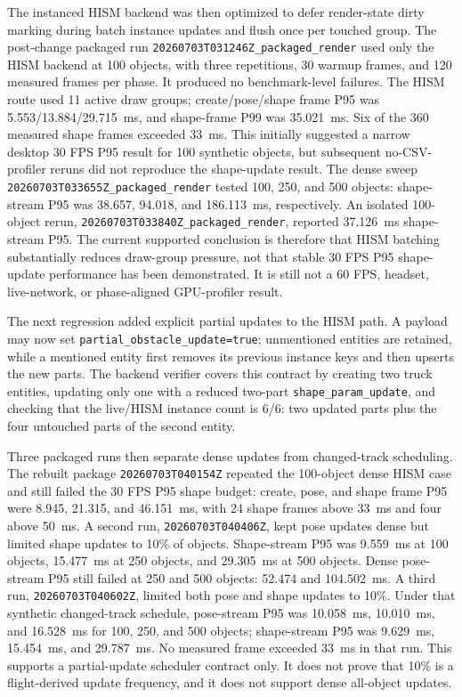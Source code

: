 ﻿\documentclass[11pt,a4paper]{article}
\begin{document}
The instanced HISM backend was then optimized to defer render-state dirty
marking during batch instance updates and flush once per touched group. The
post-change packaged run
\texttt{20260703T031246Z\_packaged\_render} used only the HISM backend at 100
objects, with three repetitions, 30 warmup frames, and 120 measured frames per
phase. It produced no benchmark-level failures. The HISM route used 11 active
draw groups; create/pose/shape frame P95 was 5.553/13.884/29.715~ms, and
shape-frame P99 was 35.021~ms. Six of the 360 measured shape frames exceeded
33~ms. This initially suggested a narrow desktop 30 FPS P95 result for 100
synthetic objects, but subsequent no-CSV-profiler reruns did not reproduce the
shape-update result. The dense sweep
\texttt{20260703T033655Z\_packaged\_render} tested 100, 250, and 500 objects:
shape-stream P95 was 38.657, 94.018, and 186.113~ms, respectively. An isolated
100-object rerun, \texttt{20260703T033840Z\_packaged\_render}, reported
37.126~ms shape-stream P95. The current supported conclusion is therefore that
HISM batching substantially reduces draw-group pressure, not that stable 30 FPS
P95 shape-update performance has been demonstrated. It is still not a 60 FPS,
headset, live-network, or phase-aligned GPU-profiler result.

The next regression added explicit partial updates to the HISM path. A payload
may now set \texttt{partial\_obstacle\_update=true}; unmentioned entities are
retained, while a mentioned entity first removes its previous instance keys and
then upserts the new parts. The backend verifier covers this contract by creating
two truck entities, updating only one with a reduced two-part
\texttt{shape\_param\_update}, and checking that the live/HISM instance count is
6/6: two updated parts plus the four untouched parts of the second entity.

Three packaged runs then separate dense updates from changed-track scheduling.
The rebuilt package \texttt{20260703T040154Z} repeated the 100-object dense HISM
case and still failed the 30 FPS P95 shape budget: create, pose, and shape frame
P95 were 8.945, 21.315, and 46.151~ms, with 24 shape frames above 33~ms and four
above 50~ms. A second run, \texttt{20260703T040406Z}, kept pose updates dense but
limited shape updates to 10\% of objects. Shape-stream P95 was 9.559~ms at 100
objects, 15.477~ms at 250 objects, and 29.305~ms at 500 objects. Dense
pose-stream P95 still failed at 250 and 500 objects: 52.474 and 104.502~ms. A
third run, \texttt{20260703T040602Z}, limited both pose and shape updates to
10\%. Under that synthetic changed-track schedule, pose-stream P95 was
10.058~ms, 10.010~ms, and 16.528~ms for 100, 250, and 500 objects; shape-stream
P95 was 9.629~ms, 15.454~ms, and 29.787~ms. No measured frame exceeded 33~ms in
that run. This supports a partial-update scheduler contract only. It does not
prove that 10\% is a flight-derived update frequency, and it does not support
dense all-object updates.
\end{document}
